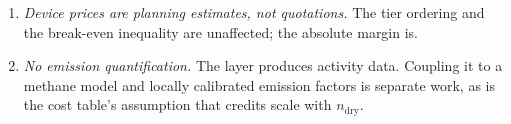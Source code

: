 \begin{enumerate}
efficiencies and five initial states bracket the delta but do not exhaust it. A
field outside $\Theta$ loses the guarantee of Proposition~3 of the main text,
which is exactly the situation the proportional threshold and the query verdict
exist to absorb.
\item \emph{Device prices are planning estimates, not quotations.} The tier
ordering and the break-even inequality are unaffected; the absolute margin is.
\item \emph{No emission quantification.} The layer produces activity data.
Coupling it to a methane model and locally calibrated emission factors is
separate work, as is the cost table's assumption that credits scale with
$n_{\mathrm{dry}}$.
\end{enumerate}





